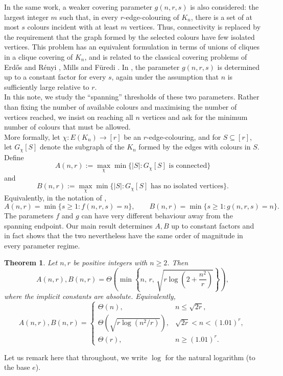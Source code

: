 \documentclass[11pt,a4paper]{article}
\newtheorem{theorem}{Theorem}[section]
\begin{document}
\noindent
In the same work, a weaker covering parameter $g(n,r,s)$ is also considered: the largest integer $m$ such that, in every $r$-edge-colouring of $K_n$, there is a set of at most $s$ colours incident with at least $m$ vertices. Thus, connectivity is replaced by the requirement that the graph formed by the selected colours have few isolated vertices. This problem has an equivalent formulation in terms of unions of cliques in a clique covering of $K_n$, and is related to the classical covering problems of Erd\H{o}s and R\'enyi \cite{ErdosRenyi1956}, Mills \cite{Mills1979} and F\"uredi \cite{Furedi1990}. In \cite{ABCK2024}, the parameter $g(n,r,s)$ is determined up to a constant factor for every $s$, again under the assumption that $n$ is sufficiently large relative to $r$. \\

\noindent
In this note, we study the ``spanning'' thresholds of these two parameters. Rather than fixing the number of available colours and maximising the number of vertices reached, we insist on reaching all $n$ vertices and ask for the minimum number of colours that must be allowed. \\

\noindent
More formally, let $\chi\colon E(K_n)\to[r]$ be an $r$-edge-colouring, and for $S\subseteq[r]$, let $G_{\chi}[S]$ denote the subgraph of the $K_n$ formed by the edges with colours in $S$. Define
\[
A(n,r)
:=
\max_{\chi}
\min\bigl\{
|S|:G_\chi[S]\text{ is connected}
\bigr\}
\]
and
\[
B(n,r)
:=
\max_{\chi}
\min\bigl\{
|S|:G_\chi[S]\text{ has no isolated vertices}
\bigr\}.
\]
Equivalently, in the notation of \cite{ABCK2024},
\[
A(n,r)=\min\{s\geq1:f(n,r,s)=n\},
\qquad
B(n,r)=\min\{s\geq1:g(n,r,s)=n\}.
\]
\noindent
The parameters $f$ and $g$ can have very different behaviour away from the spanning endpoint. Our main result determines $A, B$ up to constant factors and in fact shows that the two nevertheless have the same order of magnitude in every parameter regime.
\begin{theorem}
\label{thm:1:1}
Let $n,r$ be positive integers with $n\geq2$. Then
\[
A(n,r),B(n,r)
=
\Theta\left(
\min\left\{
n,\,
r,\,
\sqrt{r\log\left(2+\frac{n^2}{r}\right)}
\right\}
\right),
\]
where the implicit constants are absolute. Equivalently,
\[
A(n,r),B(n,r)
=
\begin{cases}
\Theta(n),
    & n\leq\sqrt{2r},\\[2mm]
\Theta\left(\sqrt{r\log(n^2/r)}\right),
    & \sqrt{2r}<n<
      (1.01)^r,\\[2mm]
\Theta(r),
    & n\geq
      (1.01)^r.
\end{cases}
\]
\end{theorem}
Let us remark here that throughout, we write $\log$ for the natural logarithm (to the base $e$). \\
\end{document}
